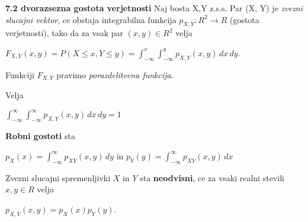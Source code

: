 \documentclass{article}
\begin{document}
\begin{multicols}{3}
\textbf{7.2 dvorazsezna gostota verjetnosti}
Naj bosta X,Y z.s.s. Par (X, Y) je \textit{zvezni slucajni vektor},
ce obstaja integrabilna funkcija $p_{X,Y}: R^2 \rightarrow R$ (gostota verjetnosti), tako da za
vsak par $(x,y) \in R^2$ velja
\begin{center}
    \begin{math}
        F_{X,Y}(x, y) = P(X \leq x, Y \leq y) = \int_{-\infty}^{x}\int_{-\infty}^{y} p_{X,Y}(x,y)\,dx\,dy
    \end{math}.
\end{center}
\begin{small}
Funkciji $F_{X,Y}$ pravimo \textit{porazdelitvena funkcija}.    
\end{small}
Velja
\begin{center}
    \begin{math}
        \int_{-\infty}^{\infty}\int_{-\infty}^{\infty} p_{X,Y}(x,y)\,dx\,dy = 1
    \end{math}
\end{center}
\textbf{Robni gostoti} sta
\begin{center}
    \begin{math}
        p_X(x) = \int_{-\infty}^{\infty} p_{XY}(x,y)\, dy
    \end{math} in
    \begin{math}
        p_Y(y) = \int_{-\infty}^{\infty} p_{XY}(x,y)\, dx
    \end{math}
\end{center}
Zvezni slucajni spremenljivki $X$ in $Y$ sta \textbf{neodvisni}, ce
za vsaki realni stevili $x, y \in R$ velja
\begin{center}
    \begin{math}
        p_{X,Y}(x,y) = p_X(x)p_Y(y)
    \end{math}.
\end{center}


\end{multicols}
\end{document}
